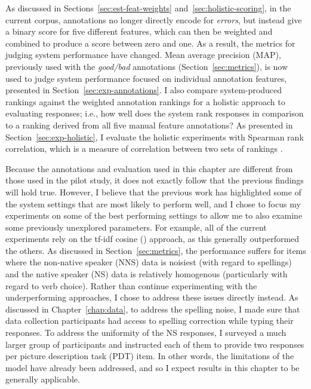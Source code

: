 As discussed in Sections~\ref{sec:est-feat-weights} and~\ref{sec:holistic-scoring}, in the current corpus, annotations no longer directly encode for \textit{errors}, but instead give a binary score for five different features, which can then be weighted and combined to produce a score between zero and one. As a result, the metrics for judging system performance have changed. Mean average precision (MAP), previously used with the \textit{good/bad} annotations (Section~\ref{sec:metrics}), is now used to judge system performance focused on individual annotation features, presented in Section~\ref{sec:exp-annotations}. I also compare system-produced rankings against the weighted annotation rankings for a holistic approach to evaluating responses; i.e., how well does the system rank responses in comparison to a ranking derived from all five manual feature annotations? As presented in Section~\ref{sec:exp-holistic}, I evaluate the holistic experiments with Spearman rank correlation, which is a measure of correlation between two sets of rankings \cite{dodge2008concise}.

Because the annotations and evaluation used in this chapter are different from those used in the pilot study, it does not exactly follow that the previous findings will hold true. However, I believe that the previous work has highlighted some of the system settings that are most likely to perform well, and I chose to focus my experiments on some of the best performing settings to allow me to also examine some previously unexplored parameters. For example, all of the current experiments rely on the tf-idf cosine () approach, as this generally outperformed the others. As discussed in Section~\ref{sec:metrics}, the  performance suffers for items where the non-native speaker (NNS) data is noisiest (with regard to spellings) and the native speaker (NS) data is relatively homogenous (particularly with regard to verb choice). Rather than continue experimenting with the underperforming approaches, I chose to address these issues directly instead. As discussed in Chapter~\ref{chap:data}, to address the spelling noise, I made sure that data collection participants had access to spelling correction while typing their responses. To address the uniformity of the NS responses, I surveyed a much larger group of participants and instructed each of them to provide two responses per picture description task (PDT) item. In other words, the limitations of the  model have already been addressed, and so I expect results in this chapter to be generally applicable.

